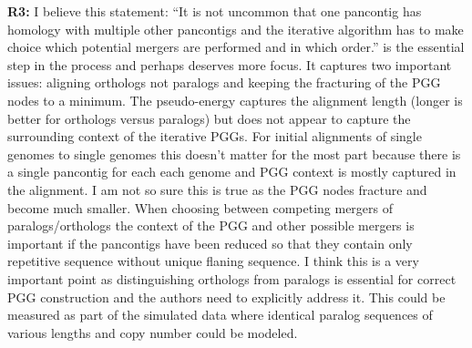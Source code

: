 \documentclass[aps,rmp,onecolumn]{revtex4-1}
\newcommand{\Marco}[1]{{\color{orange}Marco: #1}}
\newcommand{\Liam}[1]{{\color{teal}Liam: #1}}
\newcommand{\reviewer}[2]{\textbf{#1:} #2\vskip 5mm}
\begin{document}
\reviewer{R3}{I believe this statement: ``It is not uncommon that one pancontig has homology with multiple other pancontigs and the iterative algorithm has to make choice which potential mergers are performed and in which order.'' is the essential step in the process and perhaps deserves more focus. It captures two important issues: aligning orthologs not paralogs and keeping the fracturing of the PGG nodes to a minimum. The pseudo-energy captures the alignment length (longer is better for orthologs versus paralogs) but does not appear to capture the surrounding context of the iterative PGGs. For initial alignments of single genomes to single genomes this doesn't matter for the most part because there is a single pancontig for each each genome and PGG context is mostly captured in the alignment. I am not so sure this is true as the PGG nodes fracture and become much smaller. When choosing between competing mergers of paralogs/orthologs the context of the PGG and other possible mergers is important if the pancontigs have been reduced so that they contain only repetitive sequence without unique flaning sequence. I think this is a very important point as distinguishing orthologs from paralogs is essential for correct PGG construction and the authors need to explicitly address it. This could be measured as part of the simulated data where identical paralog sequences of various lengths and copy number could be modeled.}
\end{document}
